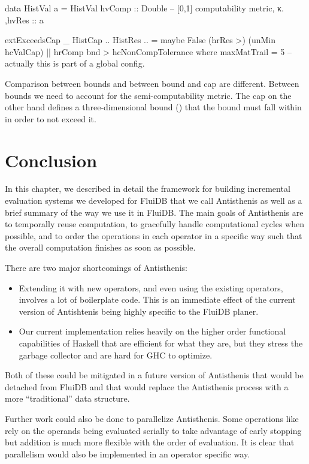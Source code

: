 \begin{code}
\begin{haskellcode}
data HistVal a =
  HistVal
  { hvComp :: Double  -- [0,1] computability metric, κ.
   ,hvRes :: a
  }

extExceedsCap _ HistCap {..} HistRes {..} =
  maybe False (hrRes >) (unMin hcValCap)
  || hrComp bnd > hcNonCompTolerance
  where
    maxMatTrail = 5 -- actually this is part of a global config.
\end{haskellcode}
  \caption{\label{lst:def_histval}Comparison between bounds and
    between bound and cap are different. Between bounds we need to
    account for the semi-computability metric. The cap on the other
    hand defines a three-dimensional bound () that the bound must fall
    within in order to not exceed it.}
\end{code}

\section{Conclusion}

In this chapter, we described in detail the framework for building
incremental evaluation systems we developed for FluiDB that we call
Antisthenis as well as a brief summary of the way we use it in
FluiDB. The main goals of Antisthenis are to temporally reuse computation, to
gracefully handle computational cycles when possible, and to order the operations in
each operator in a specific way such that the overall computation
finishes as soon as possible.

There are two major shortcomings of Antisthenis:

\begin{itemize}
\item Extending it with new operators, and even using the existing operators,
involves a lot of boilerplate code. This is an immediate effect of the
current version of Antishtenis being highly specific to the FluiDB
planer.
\item Our current implementation relies heavily on the higher order
functional capabilities of Haskell that are efficient for what they
are, but they stress the garbage collector and are hard for GHC to
optimize.
\end{itemize}

Both of these could be mitigated in a future version of Antisthenis
that would be detached from FluiDB and that would replace the
Antisthenis process with a more ``traditional'' data structure.

Further work could also be done to parallelize Antisthenis. Some
operations like  rely on the operands being evaluated
serially to take advantage of early stopping but addition is much more
flexible with the order of evaluation. It is clear that parallelism
would also be implemented in an operator specific way.

